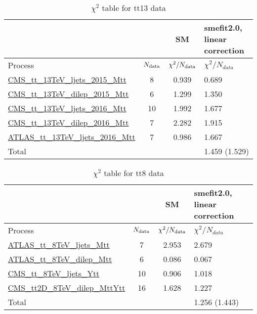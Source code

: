 \documentclass{article}
\begin{document}
\begin{table}[H]
\centering
\begin{tabular}{|l|c|c|C{3cm}|}
\hline
  & SM& smefit2.0, linear correction\\ \hline
Process & $N_{\rm data}$ & $\chi^ 2/N_{\rm data}$& $\chi^ 2/N_{data}$\\ \hline
\href{https://arxiv.org/abs/1610.04191}{CMS_tt_13TeV_ljets_2015_Mtt} & 8 & 0.939 & {\color{blue} 0.689} \\ \hline
\href{https://arxiv.org/abs/1708.07638}{CMS_tt_13TeV_dilep_2015_Mtt} & 6 & 1.299 & {\color{black} 1.350} \\ \hline
\href{https://arxiv.org/abs/1803.08856}{CMS_tt_13TeV_ljets_2016_Mtt} & 10 & 1.992 & {\color{black} 1.677} \\ \hline
\href{https://arxiv.org/abs/1811.06625}{CMS_tt_13TeV_dilep_2016_Mtt} & 7 & 2.282 & {\color{blue} 1.915} \\ \hline
\href{https://arxiv.org/abs/1908.07305}{ATLAS_tt_13TeV_ljets_2016_Mtt} & 7 & 0.986 & {\color{red} 1.667} \\ \hline
\hline Total & &  & 1.459 (1.529) \\ \hline
\end{tabular}
\caption{$\chi^2$ table for tt13 data}
\end{table}
\begin{table}[H]
\centering
\begin{tabular}{|l|c|c|C{3cm}|}
\hline
  & SM& smefit2.0, linear correction\\ \hline
Process & $N_{\rm data}$ & $\chi^ 2/N_{\rm data}$& $\chi^ 2/N_{data}$\\ \hline
\href{https://arxiv.org/abs/1511.04716}{ATLAS_tt_8TeV_ljets_Mtt} & 7 & 2.953 & {\color{black} 2.679} \\ \hline
\href{https://arxiv.org/abs/1607.07281}{ATLAS_tt_8TeV_dilep_Mtt} & 6 & 0.086 & {\color{black} 0.067} \\ \hline
\href{https://arxiv.org/abs/1505.04480}{CMS_tt_8TeV_ljets_Ytt} & 10 & 0.906 & {\color{black} 1.018} \\ \hline
\href{https://arxiv.org/abs/1703.01630}{CMS_tt2D_8TeV_dilep_MttYtt} & 16 & 1.628 & {\color{blue} 1.227} \\ \hline
\hline Total & &  & 1.256 (1.443) \\ \hline
\end{tabular}
\caption{$\chi^2$ table for tt8 data}
\end{table}
\end{document}
